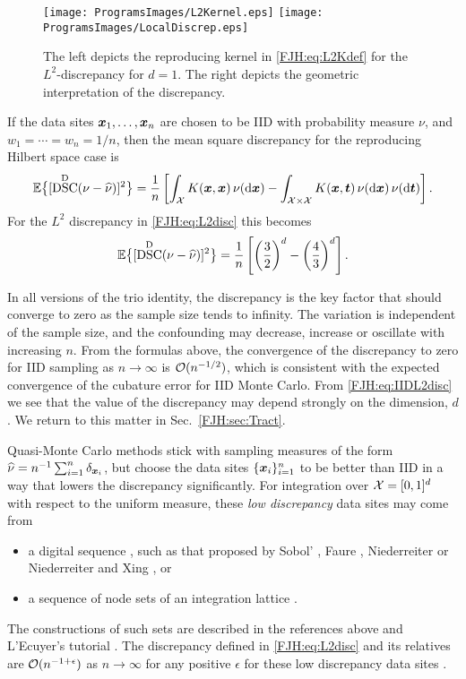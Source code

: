\documentclass[graybox,footinfo]{svmult}
\DeclareMathOperator{\disc}{DSC}
\begin{document}
\begin{figure}
	\centering
	\texttt{[image: ProgramsImages/L2Kernel.eps]}\qquad
	\texttt{[image: ProgramsImages/LocalDiscrep.eps]}
	\caption{The left depicts the reproducing kernel in \eqref{FJH:eq:L2Kdef} for the 
	$L^2$-discrepancy 
	for $d=1$.  The right depicts the geometric interpretation of the discrepancy.
	\label{FJH:fig:L2ker}}
\end{figure}

If the data sites  ${\boldsymbol{x}}_{1}, \ldots, {\boldsymbol{x}}_{n}$ are chosen to be IID with probability measure 
$\nu$, and $w_1 = \cdots = w_n = 1/n$, then 
the mean square discrepancy for 
the reproducing Hilbert space case is
\begin{equation*}
\bbE \bigl\{[\disc^{\Dt}(\nu - \hnu)]^2 \bigr \}  = \frac 1 n \left [ \int_{\calX} K(\bsx,\bsx) \, 
\nu(\D 
\bsx) - 
\int_{\calX \times \calX} K(\bsx,\bst) \, \nu(\D \bsx) \, \nu (\D \bst) \right ].
\end{equation*}
For the $L^2$ discrepancy in \eqref{FJH:eq:L2disc} this becomes 
\begin{equation} \label{FJH:eq:IIDL2disc}
\bbE \bigl\{[\disc^{\Dt}(\nu - \hnu)]^2 \bigr \} = \frac 1 n \left [ \left(\frac 32\right)^d - 
\left(\frac 43\right)^d \right ].
\end{equation}

In all versions of the trio identity, the discrepancy is the key factor that should converge 
to 
zero as the sample size tends to infinity.  The variation is independent of the sample 
size, and the confounding may decrease, increase or oscillate with increasing $n$.  From 
the formulas above, the convergence of the discrepancy to zero for IID sampling as $n 
\to 
\infty$ is  ${\mathcal{O}}(n^{-1/2})$, which is consistent with the expected convergence of the 
cubature error for IID Monte Carlo.  From \eqref{FJH:eq:IIDL2disc} we see that the 
value of the discrepancy may depend strongly on the dimension, $d$.  We return 
to this matter in Sec.\  \ref{FJH:sec:Tract}.

Quasi-Monte Carlo methods stick with sampling measures of the form  $\widehat{\nu} = 
n^{-1}\sum_{i=1}^n \delta_{{\boldsymbol{x}}_i}$, but choose the data sites $\{{\boldsymbol{x}}_i\}_{i=1}^n$ to be 
better than IID in a way that lowers the discrepancy significantly.  For 
integration over ${\mathcal{X}} = [0,1]^d$ with 
respect to the uniform measure, these \emph{low discrepancy} data sites may come from
\begin{itemize} 
\item a digital sequence \cite{DicPil10a}, such as that proposed by Sobol' \cite{Sob67}, 
Faure \cite{Fau82}, Niederreiter \cite{Nie88} or Niederreiter and Xing \cite{NieXin96}, or 
\item a sequence of node sets of an integration lattice \cite{SloJoe94}.  
\end{itemize}
The 
constructions of such sets are described in the references above and L'Ecuyer's 
tutorial 
\cite{}.  The discrepancy defined in \eqref{FJH:eq:L2disc} and its relatives are 
${\mathcal{O}}(n^{-1+\epsilon})$ as $n \to \infty$ for any positive $\epsilon$ for these low 
discrepancy data sites \cite{Nie92}.  
\end{document}
